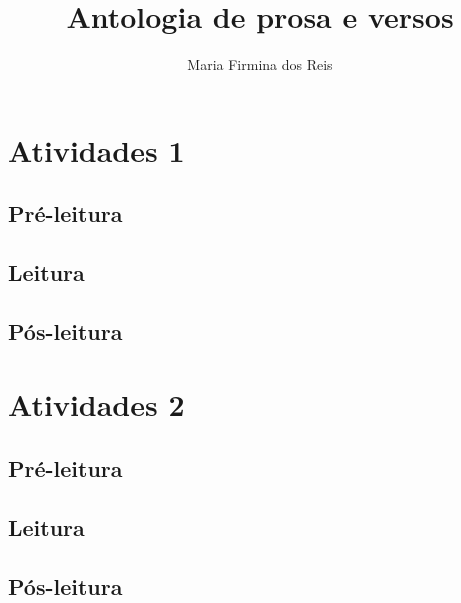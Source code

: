 \documentclass{article}
\begin{document}
\newcommand{\AutorLivro}{Maria Firmina dos Reis}
\newcommand{\TituloLivro}{Antologia de prosa e versos}
\newcommand{\Tema}{Ficção, mistério e fantasia}
\newcommand{\Genero}{Conto; crônica, novela e poema}
\newcommand{\issnppub}{---}
\newcommand{\issnepub}{---}
\newcommand{\colaborador}{\textbf{Fulano de Tal} é uma pessoa incrível e vai fazer um bom serviço.}


\title{\TituloLivro}
\author{\AutorLivro}
\def\authornotes{\colaborador}

\date{}
\maketitle
\tableofcontents




\section{Atividades 1}


\subsection{Pré-leitura}
\subsection{Leitura}
\subsection{Pós-leitura}



\section{Atividades 2}

\subsection{Pré-leitura}
\subsection{Leitura}
\subsection{Pós-leitura}

\lipsum
\end{document}
